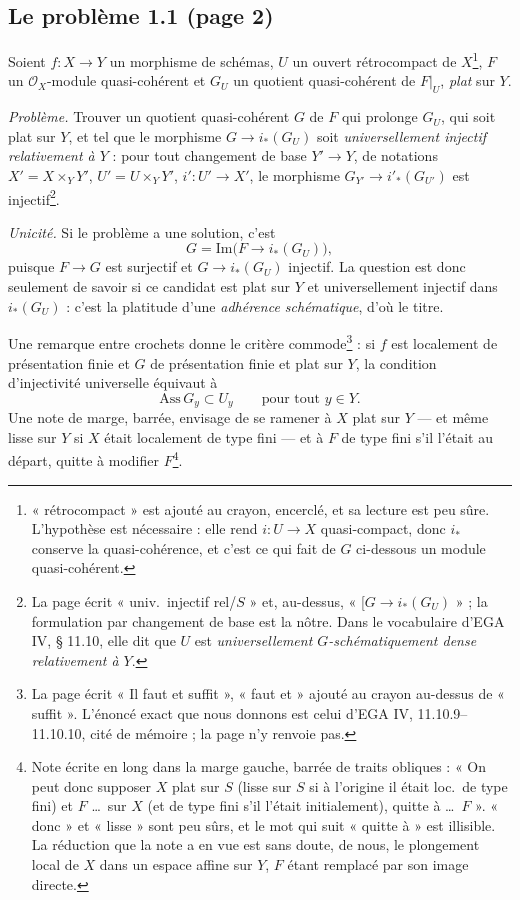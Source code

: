 \documentclass[11pt,a4paper]{article}
\begin{document}
\subsection*{Le problème 1.1 (page 2)}

Soient $f \colon X \to Y$ un morphisme de schémas, $U$ un ouvert
rétrocompact de $X$\footnote{« rétrocompact » est ajouté au crayon, encerclé,
et sa lecture est peu sûre. L'hypothèse est nécessaire : elle rend
$i \colon U \to X$ quasi-compact, donc $i_*$ conserve la quasi-cohérence, et
c'est ce qui fait de $G$ ci-dessous un module quasi-cohérent.}, $F$ un
$\mathcal{O}_X$-module quasi-cohérent et $G_U$ un quotient quasi-cohérent de
$F|_U$, \emph{plat} sur $Y$.

\emph{Problème.} Trouver un quotient quasi-cohérent $G$ de $F$ qui prolonge
$G_U$, qui soit plat sur $Y$, et tel que le morphisme $G \to i_*(G_U)$ soit
\emph{universellement injectif relativement à $Y$} : pour tout changement de
base $Y' \to Y$, de notations $X' = X \times_Y Y'$, $U' = U \times_Y Y'$,
$i' \colon U' \to X'$, le morphisme $G_{Y'} \to i'_*(G_{U'})$ est
injectif\footnote{La page écrit « univ.\ injectif rel/$S$ » et, au-dessus,
« [$G \to i_*(G_U)$ » ; la formulation par changement de base est la nôtre.
Dans le vocabulaire d'EGA IV, § 11.10, elle dit que $U$ est
\emph{universellement $G$-schématiquement dense relativement à $Y$}.}.

\emph{Unicité.} Si le problème a une solution, c'est
\[
  G = \mathrm{Im}\bigl(F \to i_*(G_U)\bigr) ,
\]
puisque $F \to G$ est surjectif et $G \to i_*(G_U)$ injectif. La question est
donc seulement de savoir si ce candidat est plat sur $Y$ et universellement
injectif dans $i_*(G_U)$ : c'est la platitude d'une \emph{adhérence
schématique}, d'où le titre.

Une remarque entre crochets donne le critère commode\footnote{La page écrit
« Il faut et suffit », « faut et » ajouté au crayon au-dessus de « suffit ».
L'énoncé exact que nous donnons est celui d'EGA IV,
11.10.9--11.10.10, cité de mémoire ; la page n'y renvoie pas.} : si $f$ est
localement de présentation finie et $G$ de présentation finie et plat sur
$Y$, la condition d'injectivité universelle équivaut à
\[
  \mathrm{Ass}\, G_y \subset U_y \qquad \text{pour tout } y \in Y .
\]
Une note de marge, barrée, envisage de se ramener à $X$ plat sur $Y$ --- et
même lisse sur $Y$ si $X$ était localement de type fini --- et à $F$ de type
fini s'il l'était au départ, quitte à modifier $F$\footnote{Note écrite en long
dans la marge gauche, barrée de traits obliques : « On peut donc supposer $X$
plat sur $S$ (lisse sur $S$ si à l'origine il était loc.\ de type fini) et $F$
\ldots\ sur $X$ (et de type fini s'il l'était initialement), quitte à \ldots\
$F$ ». « donc » et « lisse » sont peu sûrs, et le mot qui suit « quitte à »
est illisible. La réduction que la note a en vue est sans doute, de nous, le
plongement local de $X$ dans un espace affine sur $Y$, $F$ étant remplacé par
son image directe.}.
\end{document}
